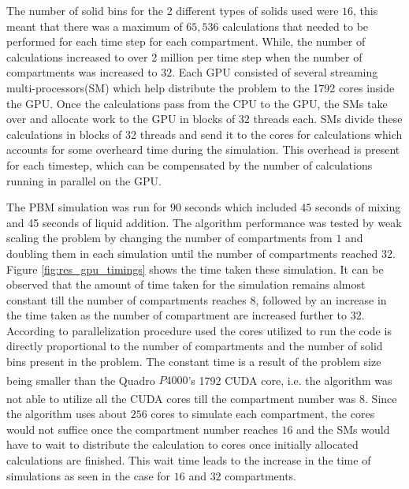 \documentclass[review]{elsarticle}
\begin{document}
\begin{linenumbers}
The number of solid bins for the 2 different types of solids used were $16$, 
this meant that there was a maximum of $65,536$ calculations that needed to 
be performed for each time step for each compartment. While, the
number of calculations increased to over 2 million per time step when the number of 
compartments was increased to $32$. Each GPU consisted of several streaming 
multi-processors(SM) which help distribute the problem to the 1792 cores inside 
the GPU. Once the calculations  pass from the CPU to the GPU, the SMs take 
over and allocate work to the GPU in blocks of $32$ threads each. 
SMs divide these calculations in blocks 
of 32 threads and send it to the cores for calculations which accounts for some 
overheard time during the simulation. This overhead is present for each timestep, 
which can be compensated by the number of calculations running in parallel on 
the GPU. 

The PBM simulation was run for $90$ seconds which included $45$ seconds of mixing 
and 45 seconds of liquid addition. The algorithm performance was tested by weak scaling 
the problem by changing the number of compartments from $1$ and doubling them in 
each simulation until the number of compartments reached $32$. Figure \ref{fig:res_gpu_timings} 
shows the time taken these simulation. It can be observed that the amount of time taken 
for the simulation remains almost constant till the number of compartments reaches $8$, 
followed by an increase in the time taken as the number of compartment are increased 
further to $32$. According to parallelization procedure used the cores utilized to run the 
code is directly proportional to the number of compartments and the number of solid bins 
present in the problem. The constant time is a result of the problem size being smaller than 
the Quadro $P4000$'s 1792 CUDA\textsuperscript{\tiny\textregistered} core, i.e. 
the algorithm was not able to utilize all the 
CUDA\textsuperscript{\tiny\textregistered} cores till the compartment number was $8$. 
Since the algorithm uses about $256$ cores 
to simulate each compartment, the cores would not suffice once the compartment number reaches 
$16$ and the SMs would have to wait to distribute the calculation to cores once 
initially allocated calculations are finished. This wait time leads to the increase in the 
time of simulations as seen in the case for $16$ and $32$ compartments. 


\end{linenumbers}
\end{document}
